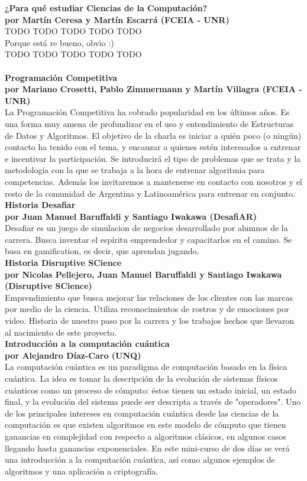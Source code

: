 \documentclass[12pt, a4paper]{article}
\newcommand{\charla}[3]{
	{\large\bf#1}\\
	{\bf por #2}\\
	#3\\
}
\begin{document}
\charla
{¿Para qué estudiar Ciencias de la Computación?}
{Martín Ceresa y Martín Escarrá (FCEIA - UNR)}
{TODO TODO TODO TODO TODO\\
Porque está re bueno, obvio :) \\
TODO TODO TODO TODO TODO\\}

\charla
{Programación Competitiva}
{Mariano Crosetti, Pablo Zimmermann y Martín Villagra (FCEIA - UNR)}
{La Programación Competitiva ha cobrado popularidad en los últimos años. Es una forma muy amena de profundizar en el uso y entendimiento de Estructuras de Datos y Algoritmos. El objetivo de la charla es iniciar a quién poco (o ningún) contacto ha tenido con el tema, y encauzar a quienes estén interesados a entrenar e incentivar la participación. Se introducirá el tipo de problemas que se trata y la metodología con la que se trabaja a la hora de entrenar algoritmia para competencias. Además los invitaremos a mantenerse en contacto con nosotros y el resto de la comunidad de Argentina y Latinoamérica para entrenar en conjunto.}

\charla
{Historia Desafiar}
{Juan Manuel Baruffaldi y Santiago Iwakawa (DesafiAR)}
{Desafiar es un juego de simulacion de negocios desarrollado por alumnos de la carrera. Busca inventar el espíritu emprendedor y capacitarlos en el camino. Se basa en gamification, es decir, que aprendan jugando.}

\charla
{Historia Disruptive SCience}
{Nicolas Pellejero, Juan Manuel Baruffaldi y Santiago Iwakawa (Disruptive SCience)}
{Emprendimiento que busca mejorar las relaciones de los clientes con las marcas por medio de la ciencia. Utiliza reconocimientos de rostros y de emociones por video. Historia de nuestro paso por la carrera y los trabajos hechos que llevaron al nacimiento de este proyecto.}

\charla
{Introducción a la computación cuántica}
{Alejandro Díaz-Caro (UNQ)}
{La computación cuántica es un paradigma de computación basado en la física cuántica. La idea es tomar la descripción de la evolución de sistemas físicos cuánticos como un proceso de cómputo: éstos tienen un estado inicial, un estado final, y la evolución del sistema puede ser descripta a través de "operadores". Uno de los principales intereses en computación cuántica desde las ciencias de la computación es que existen algoritmos en este modelo de cómputo que tienen ganancias en complejidad con respecto a algoritmos clásicos, en algunos casos llegando hasta ganancias exponenciales. En este mini-curso de dos días se verá una introducción a la computación cuántica, así como algunos ejemplos de algoritmos y una aplicación a criptografía.}
\end{document}
